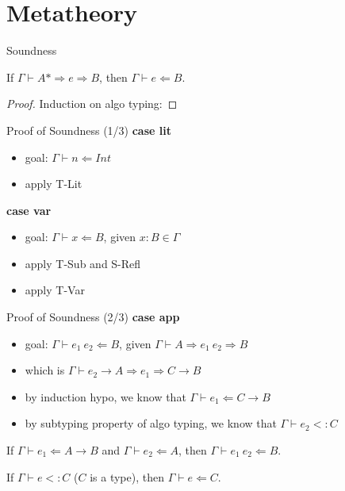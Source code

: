\documentclass[compress,12pt,aspectratio=169]{beamer}
\begin{document}
\section{Metatheory}

\begin{frame}{Soundness}
\begin{theorem}[Soundness]
If $\Gamma \vdash A* \Rightarrow e \Rightarrow B$, then $\Gamma \vdash e \Leftarrow B.$
\begin{proof}
Induction on algo typing:
\end{proof}
\end{theorem}
\end{frame}

\begin{frame}{Proof of Soundness (1/3)}
\textbf{case lit}
\begin{itemize}
    \item goal: $\Gamma \vdash n \Leftarrow Int$
    \item apply T-Lit
\end{itemize}
\noindent\makebox[\linewidth]{\rule{\paperwidth}{0.4pt}}
\textbf{case var}
\begin{itemize}
    \item goal: $\Gamma \vdash x \Leftarrow B$, given $x : B \in \Gamma$
    \item apply T-Sub and S-Refl
    \item apply T-Var
\end{itemize}
\end{frame}

\begin{frame}{Proof of Soundness (2/3)}
\textbf{case app}
\begin{itemize}
    \item goal: $\Gamma \vdash e_1~e_2 \Leftarrow B$, given $\Gamma \vdash A \Rightarrow e_1~e_2 \Rightarrow B$
    \item which is $\Gamma \vdash \boxed{e_2} \rightarrow A \Rightarrow e_1 \Rightarrow C \rightarrow B$
    \item by induction hypo, we know that $\Gamma \vdash e_1 \Leftarrow C \rightarrow B$
    \item by subtyping property of algo typing, we know that $\Gamma \vdash \boxed{e_2} <: C$
\end{itemize}
\noindent\makebox[\linewidth]{\rule{\paperwidth}{0.4pt}}
\begin{lemma}
If $\Gamma \vdash e_1 \Leftarrow A \rightarrow B$ and $\Gamma \vdash e_2 \Leftarrow A$, then $\Gamma \vdash e_1~e_2 \Leftarrow B$.
\end{lemma}
\begin{lemma}
If 	$\Gamma \vdash \boxed{e} <: C$ ($C$ is a type), then $\Gamma \vdash e \Leftarrow C$.
\end{lemma}
\end{frame}
\end{document}

